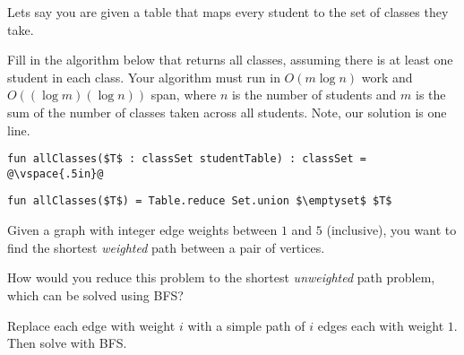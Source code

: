 \begin{cluster}
\label{grp:prb:examii-practice::classes}

\begin{problem}[4][Classes]
\label{prb:examii-practice::classes}

Lets say you are given a table that maps every student to the set of
classes they take.  

\ask \label{prt-ask:examii-practice::fill}

Fill in the algorithm below that returns all classes,
assuming there is at least one student in each class.  Your algorithm
must run in $O(m \log n)$ work and $O((\log m)(\log n))$ span, where
$n$ is the number of students and $m$ is the sum of the number of
classes taken across all students.    Note, our solution is one line.

\begin{lstlisting}[numbers=none]
fun allClasses($T$ : classSet studentTable) : classSet = 
@\vspace{.5in}@
\end{lstlisting}


\sol \label{cki-sol:examii-practice::numbers}

\begin{lstlisting}[numbers=none]
fun allClasses($T$) = Table.reduce Set.union $\emptyset$ $T$
\end{lstlisting}

\end{problem}
\end{cluster}

\begin{cluster}
\label{grp:prb:examii-practice::shortest-weighted}

\begin{problem}
\label{prb:examii-practice::shortest-weighted}

Given a graph with integer edge weights between $1$ and $5$
(inclusive), you want to find the shortest \emph{weighted} path
between a pair of vertices. 

\ask \label{prt-ask:examii-practice::would}

How would you reduce this problem to the
shortest \emph{unweighted} path problem, which can be solved using
BFS?


\sol \label{cki-sol:examii-practice::replace}

Replace each edge with weight $i$ with a simple path of $i$ edges
each with weight $1$. Then solve with BFS.

\end{problem}
\end{cluster}

